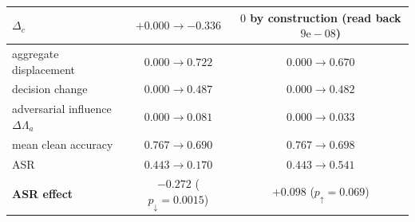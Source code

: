 \documentclass{article}
\begin{document}
\begin{table}[h]
\begin{tabular}{lcc}
$\Delta_c$ & $+0.000 \to \mathbf{-0.336}$ & $0$ by construction (read back $9\mathrm{e}{-}08$) \\
\midrule
aggregate displacement & $0.000 \to 0.722$ & $0.000 \to 0.670$ \\
decision change & $0.000 \to 0.487$ & $0.000 \to 0.482$ \\
adversarial influence $\Delta\Lambda_a$ & $0.000 \to \mathbf{0.081}$ & $0.000 \to \mathbf{0.033}$ \\
mean clean accuracy & $0.767 \to 0.690$ & $0.767 \to 0.698$ \\
ASR & $0.443 \to 0.170$ & $0.443 \to 0.541$ \\
\midrule
\textbf{ASR effect} & $\mathbf{-0.272}$ ($p_{\downarrow}=0.0015$) & $\mathbf{+0.098}$ ($p_{\uparrow}=0.069$) \\
\bottomrule
\end{tabular}
\end{table}
\end{document}
